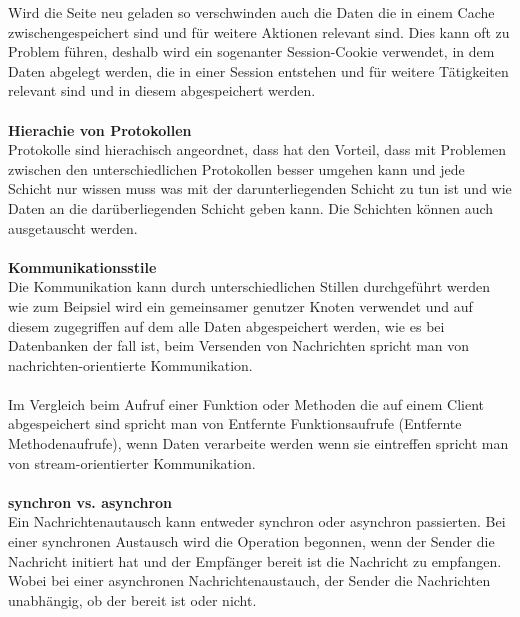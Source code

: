 \documentclass[a4paper,12pt]{article}
\begin{document}
Wird die Seite neu geladen so verschwinden auch die Daten die in einem Cache zwischengespeichert sind und für weitere Aktionen relevant sind. Dies kann oft zu Problem führen, deshalb wird ein sogenanter Session-Cookie verwendet, in dem Daten abgelegt werden, die in einer Session entstehen und für weitere Tätigkeiten relevant sind und in diesem abgespeichert werden.\\ \\
\textbf{Hierachie von Protokollen\\}
Protokolle sind hierachisch angeordnet, dass hat den Vorteil, dass mit Problemen zwischen den unterschiedlichen Protokollen besser umgehen kann und jede Schicht nur wissen muss was mit der darunterliegenden Schicht zu tun ist und wie Daten an die darüberliegenden Schicht geben kann. Die Schichten können auch ausgetauscht werden.
\\\\
\textbf{Kommunikationsstile\\}
Die Kommunikation kann durch unterschiedlichen Stillen durchgeführt werden wie zum Beipsiel wird ein gemeinsamer genutzer Knoten verwendet und auf diesem zugegriffen auf dem alle Daten abgespeichert werden, wie es bei Datenbanken der fall ist, beim Versenden von Nachrichten spricht man von nachrichten-orientierte Kommunikation. \\\\
Im Vergleich beim Aufruf einer Funktion oder Methoden die auf einem Client abgespeichert sind
spricht man von Entfernte Funktionsaufrufe (Entfernte Methodenaufrufe), wenn Daten verarbeite werden wenn sie eintreffen spricht man von stream-orientierter Kommunikation.\\\\
\textbf{synchron vs. asynchron\\}
Ein Nachrichtenautausch kann entweder synchron oder asynchron passierten. Bei einer synchronen Austausch wird die Operation begonnen, wenn der Sender die Nachricht initiert hat und der Empfänger bereit ist die Nachricht zu empfangen. Wobei bei einer asynchronen Nachrichtenaustauch, der Sender die Nachrichten unabhängig, ob der bereit ist oder nicht. 
\newpage
\end{document}
